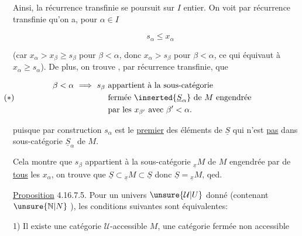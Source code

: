 

Ainsi, la récurrence transfinie se poursuit sur $I$  entier.  On voit par récurrence transfinie qu'on a, pour  $\alpha\in I$

\[s_\alpha\leq x_\alpha\]

(car $x_\alpha>x_\beta\geq s_\beta$ pour  $\beta<\alpha$, donc $x_\alpha>s_\beta$ pour  $\beta<\alpha$,  ce qui équivaut à $x_\alpha\geq s_\alpha$). De plus, on trouve , par récurrence transfinie, que

\[
\begin{aligned}
\beta<\alpha\ \Longrightarrow\ s_\beta\ &\text{appartient à la sous-catégorie}\\
 &\text{fermée }\inserted{\underline S_\alpha}\text{ de }M\text{ engendrée}\\
 &\text{par les }x_{\beta'}\text{ avec }\beta'<\alpha .
\end{aligned}\tag*{\makebox[0pt][r]{$(*)$\hspace{.90\linewidth}}}
\]

puisque par construction $s_\alpha$ est le \uline{premier} des éléments de $\underline S$  qui n'est \uline{pas} dans  sous-catégorie  $\underline S_\alpha$ de $M$.

Cela montre que  $s_\beta$ appartient à la sous-catégorie  $ {}_{\underline x}M$ de $M$ engendrée par   de \uline{tous} les  $x_\alpha$,  on trouve que $\underline S\subset{}_{\underline x}M\subset\underline S$ donc $\underline S={}_{\underline x}M$, qed.

\uline{Proposition} 4.16.7.5. Pour un univers $\unsure{\mathcal U|U}$ donné (contenant $\unsure{\mathbb N|N}$ ), les conditions suivantes sont équivalentes:

1) Il existe une catégorie $\mathcal U$-accessible $M$,  une catégorie fermée non accessible

